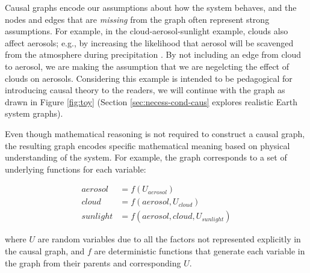 \documentclass[12pt]{article}
\begin{document}
Causal graphs encode our assumptions about how the system behaves, and
the nodes and edges that are \textit{missing} from the graph often
represent strong assumptions. For example, in the
cloud-aerosol-sunlight example, clouds also affect aerosols; e.g., by
increasing the likelihood that aerosol will be scavenged from the
atmosphere during precipitation \citep[e.g.,][]{radke-scavenge-1980,
  jurado2008, blanco-alegre2018}. By not including an edge from cloud
to aerosol, we are making the assumption that we are negelcting the
effect of clouds on aerosols. Considering this example is intended to
be pedagogical for introducing causal theory to the readers, we will
continue with the graph as drawn in Figure \ref{fig:toy} (Section
\ref{sec:necess-cond-caus} explores realistic Earth system graphs).

Even though mathematical reasoning is not required to construct a
causal graph, the resulting graph encodes specific mathematical
meaning based on physical understanding of the system. For example,
the graph corresponds to a set of underlying functions for each
variable:

\begin{align}
  \label{eq:2}
  aerosol &= f(U_{aerosol}) \\
  cloud &= f(aerosol, U_{cloud})\\
  sunlight &= f(aerosol, cloud, U_{sunlight})
\end{align}

where $U$ are random variables due to all the factors not represented
explicitly in the causal graph, and $f$ are deterministic functions
that generate each variable in the graph from their parents and
corresponding $U$.
\end{document}
